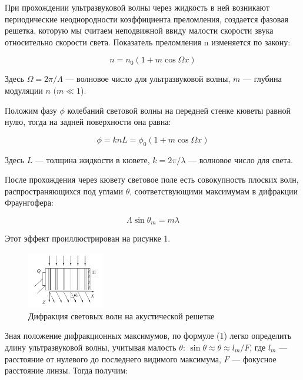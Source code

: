\documentclass[14pt,a4paper]{article}
\begin{document}
	При прохождении ультразвуковой волны через жидкость в ней возникают периодические неоднородности коэффициента преломления, создается фазовая решетка, которую мы считаем неподвижной ввиду малости скорости звука относительно скорости света. Показатель
	преломления n изменяется по закону:

	\begin{equation}\label{}
	n = n_0 (1 + m \cos \Omega x)
	\end{equation}

	Здесь $ \Omega = 2 \pi / \Lambda $ --- волновое число для ультразвуковой волны, $ m $ --- глубина модуляции $ n $ $ (m \ll 1 $).

	Положим фазу $ \phi $ колебаний световой волны на передней стенке кюветы равной нулю, тогда на задней поверхности она равна:

	\begin{equation}\label{}
	\phi  = k n L = \phi_0 (1 + m \cos \Omega x)
	\end{equation}

	Здесь $ L $ --- толщина жидкости в кювете, $ k = 2 \pi / \lambda $ --- волновое число для света.

	После прохождения через кювету световое поле есть совокупность плоских волн, распространяющихся под углами $ \theta $, соответствующими максимумам в дифракции Фраунгофера:

\begin{equation}\label{}
	\Lambda \sin \theta_m = m \lambda
\end{equation}

	Этот эффект проиллюстрирован на рисунке 1.
	\begin{figure}[h!]
		\centering
		\includegraphics[width=0.3\textwidth]{Images/difraction.png}
		\caption{Дифракция световых волн на акустической решетке}
		\label{diff}
	\end{figure}

\newpage

	Зная положение дифракционных максимумов, по формуле (1) легко определить длину ультразвуковой волны, учитывая малость $ \theta $: $ \sin \theta \approx \theta \approx l_m /F  $, где $ l_m $ --- расстояние от нулевого до последнего видимого максимума, $ F $ --- фокусное расстояние линзы. Тогда получим:
\end{document}
